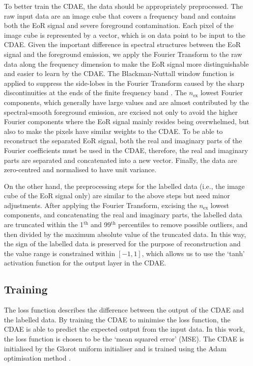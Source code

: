 \documentclass[letters,a4paper,fleqn,usenatbib]{mnras}
\newcommand{\R}[1]{\mathrm{#1}}
\begin{document}
To better train the CDAE, the data should be appropriately preprocessed.
The raw input data are an image cube that covers a frequency band and
contains both the EoR signal and severe foreground contamination.
Each pixel of the image cube is represented by a vector, which is on
data point to be input to the CDAE.
Given the important difference in spectral structures between the EoR
signal and the foreground emission, we apply the Fourier Transform to
the raw data along the frequency dimension to make the EoR signal more
distinguishable and easier to learn by the CDAE.
The Blackman-Nuttall window function is applied to suppress the side-lobes
in the Fourier Transform caused by the sharp discontinuities at the ends
of the finite frequency band \citep[e.g.,][]{chapman2016}.
The $n_{\R{ex}}$ lowest Fourier components, which generally have large
values and are almost contributed by the spectral-smooth foreground
emission, are excised not only to avoid the higher Fourier components
where the EoR signal mainly resides being overwhelmed, but also to
make the pixels have similar weights to the CDAE.
To be able to reconstruct the separated EoR signal, both the real and
imaginary parts of the Fourier coefficients must be used in the CDAE,
therefore, the real and imaginary parts are separated and concatenated
into a new vector.
Finally, the data are zero-centred and normalised to have unit variance.

On the other hand, the preprocessing steps for the labelled data (i.e.,
the image cube of the EoR signal only) are similar to the above steps
but need minor adjustments.
After applying the Fourier Transform, excising the $n_{\R{ex}}$ lowest
components, and concatenating the real and imaginary parts,
the labelled data are truncated within the 1$^{\R{th}}$ and 99$^{\R{th}}$
percentiles to remove possible outliers, and then divided by the
maximum absolute value of the truncated data.
In this way, the sign of the labelled data is preserved for the purpose
of reconstruction and the value range is constrained within $[-1, 1]$,
which allows us to use the `tanh' activation function for the output
layer in the CDAE.


\subsection{Training}
\label{sec:training}

The loss function describes the difference between the output of the
CDAE and the labelled data.
By training the CDAE to minimise the loss function, the CDAE is able
to predict the expected output from the input data.
In this work, the loss function is chosen to be the
`mean squared error' (MSE).
The CDAE is initialised by the Glorot uniform initialiser \citep{glorot2010}
and is trained using the Adam optimisation method \citep{kingma2015}.
\end{document}
